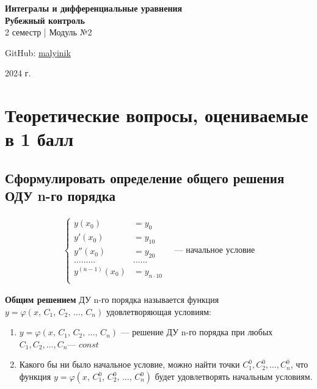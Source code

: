 



\begin{titlepage}
    \vspace*{0pt}
    \vfill
    \centering
    \Huge\textbf{Интегралы и дифференциальные уравнения} \\[7pt]
    \Large\textbf{Рубежный контроль} \\
    \large 2 семестр | Модуль №2
    \vfill
    \begin{flushright}
        \normalsize GitHub: \href{https://github.com/malyinik}{malyinik} \\
    \end{flushright}
    \normalsize 2024 г.
\end{titlepage}
\newpage

\tableofcontents
\newpage

\section{Теоретические вопросы, оцениваемые в 1 балл}

\subsection{Сформулировать определение общего решения ОДУ n-го порядка}
\vspace{-2\topsep}
\begin{gather*}
    \left\{ \begin{aligned}
        y(x_0) &= y_0 \\
        y'(x_0) &= y_{10} \\
        y''(x_0) &= y_{20} \\
        \ldots\ldots\ldots&\ldots\ldots \\
        y^{(n-1)}(x_0) &= y_{n\cdot 10} \\
    \end{aligned} \right. \quad \text{--- начальное условие}
\end{gather*}

\begin{definition*}
    \textbf{Общим решением} ДУ n-го порядка называется функция \break$y = \varphi(x,\, C_1,\, C_2,\, \ldots,\, C_n)$ удовлетворяющая условиям:
    \begin{enumerate}
        \item $y = \varphi(x,\, C_1,\, C_2,\, \ldots,\, C_n)$ --- решение ДУ n-го порядка при любых $C_1, C_2, \ldots, C_n$\nobreak --- $const$
        \item Какого бы ни было начальное условие, можно найти точки $C_1^0, C_2^0, \ldots, C_n^0$, что функция $y = \varphi(x,\, C_1^0,\, C_2^0,\, \ldots,\, C_n^0)$ будет удовлетворять начальным условиям.
    \end{enumerate}
\end{definition*}

